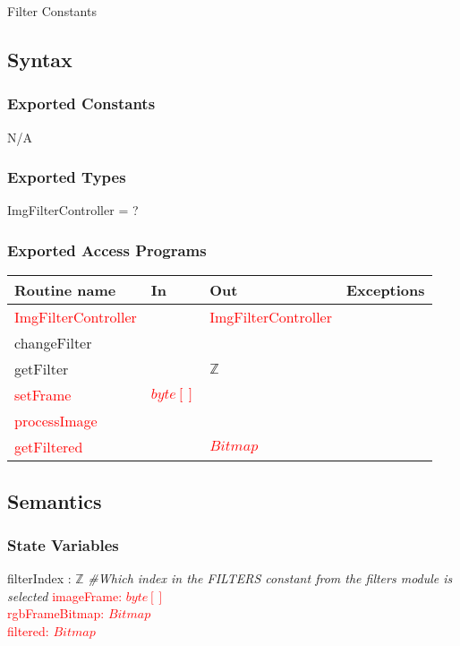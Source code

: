 \documentclass[12pt, titlepage]{article}
\begin{document}
Filter Constants

\subsection* {Syntax}

\subsubsection* {Exported Constants}

N/A


\subsubsection* {Exported Types}

ImgFilterController = ?

\subsubsection* {Exported Access Programs}

\begin{tabular}{| l | l | l | l |}
\hline
\textbf{Routine name} & \textbf{In} & \textbf{Out} & \textbf{Exceptions}\\
\hline
\textcolor{red}{ImgFilterController} & & \textcolor{red}{ImgFilterController} & \\
\hline
changeFilter &  &  & \\
\hline
getFilter &  & $\mathbb{Z}$ & \\
\hline
\textcolor{red}{setFrame} & \textcolor{red}{$byte[]$} &  & \\
\hline
\textcolor{red}{processImage} & &  & \\
\hline
\textcolor{red}{getFiltered} & & \textcolor{red}{$Bitmap$} & \\
\hline

\end{tabular}

\subsection* {Semantics}

\subsubsection* {State Variables}

filterIndex : $\mathbb{Z}$ \textit{\#Which index in the FILTERS constant from the filters module is selected}
\textcolor{red}{
imageFrame: $byte []$   \\
rgbFrameBitmap: $Bitmap$ \\
filtered: $Bitmap$  \\
}
\end{document}
